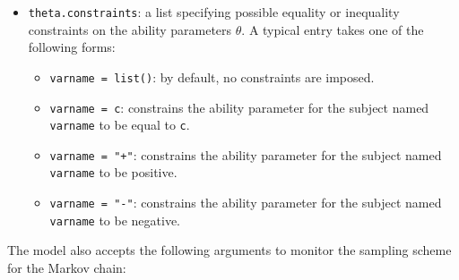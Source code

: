 \begin{itemize}
\item \texttt{theta.constraints}: a list specifying possible equality
or inequality constraints on the ability parameters $\theta$.  A
typical entry takes one of the following forms:  

\begin{itemize}

\item {\tt varname = list()}: by default, no constraints are
imposed.

\item \texttt{varname = c}:  constrains the ability parameter for the subject named 
\texttt{varname} to be equal to \texttt{c}. 

\item \texttt{varname = "+"}: constrains the ability parameter for the subject named 
\texttt{varname} to be positive. 

\item \texttt{varname = "-"}: constrains the ability parameter for the
subject named {\tt varname} to be negative.

\end{itemize}
\end{itemize} 

The model also accepts the following arguments to monitor the sampling
scheme for the Markov chain:

